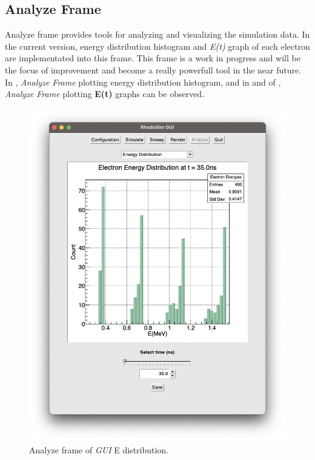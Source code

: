 \documentclass[a4paper,oneside,12pt]{report}
\numberwithin{equation}{chapter}
\begin{document}
\subsection{Analyze Frame}
Analyze frame provides tools for analyzing and visualizing the simulation data. 
In the current version, energy distribution histogram and \textit{E(t)} graph of each electron are implementated into this frame.
This frame is a work in progress and will be the focus of improvement and become a really powerfull tool in the near future.
In , \textit{Analyze Frame} plotting energy distribution histogram, and in  and  of , \textit{Analyze Frame} plotting \textbf{E(t)} graphs can be observed.
\vspace{10pt}
\begin{figure}[h!]
    \centering
    \includegraphics[width=0.8\linewidth]{./figures/rhodoSim/GUI_analyze_Edist_2.png}
    \caption{Analyze frame of \textit{GUI} E distribution.}
    \label{fig:gui_analyze_Edist}
\end{figure}
\end{document}
